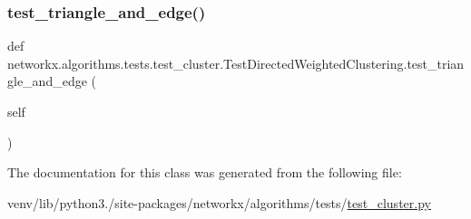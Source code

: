 \subsubsection{\texorpdfstring{test\+\_\+triangle\+\_\+and\+\_\+edge()}{test\_triangle\_and\_edge()}}
{\footnotesize\ttfamily def networkx.\+algorithms.\+tests.\+test\+\_\+cluster.\+Test\+Directed\+Weighted\+Clustering.\+test\+\_\+triangle\+\_\+and\+\_\+edge (\begin{DoxyParamCaption}\item[{}]{self }\end{DoxyParamCaption})}



The documentation for this class was generated from the following file\+:\begin{DoxyCompactItemize}
\item 
venv/lib/python3./site-\/packages/networkx/algorithms/tests/\hyperlink{tests_2test__cluster_8py}{test\+\_\+cluster.\+py}\end{DoxyCompactItemize}
